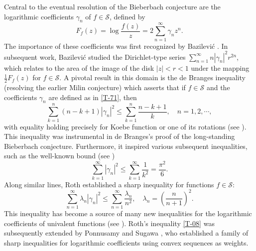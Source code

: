 \documentclass[a4paper,12pt]{amsart}
\theoremstyle{definition}
\newcounter {own}
\begin{document}
Central to the eventual resolution of the Bieberbach conjecture are the logarithmic coefficients $\gamma_n$ of $f \in \mathcal{S}$, defined by
\begin{equation}\label{T-71}
F_f(z)=\log\frac{f(z)}{z}=2\sum\limits_{n=1}^{\infty}\gamma_nz^n.
\end{equation}
The importance of these coefficients was first recognized by Bazilevi\'{c} \cite{1965-Bazilevich}. In subsequent work, Bazilevi\'{c} \cite{1967-Bazilevich} studied the Dirichlet-type series $\sum_{n=1}^{\infty} n|\gamma_n|^2 r^{2n}$, which relates to the area of the image of the disk $|z| < r<1$ under the mapping 
$\frac{1}{2}F_f(z)$ for $f\in\mathcal{S}$. A pivotal result in this domain is the de Branges inequality (resolving the earlier Milin conjecture) which asserts that if $f \in \mathcal{S}$ and the coefficients $\gamma_n$ are defined as in \eqref{T-71}, then 
$$
\sum_{k=1}^n (n-k+1)|\gamma_n|^2\le\sum_{k=1}^n \frac{n-k+1}{k}, \quad n=1,2,\cdots,
$$
with equality holding precisely for Koebe function or one of its rotations (see \cite{1985-Branges}). This inequality was instrumental in de Branges's proof of the long-standing Bieberbach conjecture. Furthermore, it inspired various subsequent inequalities, such as the well-known bound (see \cite{1979-Duren})
$$
\sum_{k=1}^\infty|\gamma_n|^2\le\sum_{k=1}^\infty \frac{1}{k^2}=\frac{\pi^2}{6}.
$$
Along similar lines, Roth \cite{Roth-2007} established a sharp inequality for functions $f \in \mathcal{S}$:
\begin{equation}\label{T-08}
\sum_{n=1}^{\infty} \lambda_n |\gamma_n|^2 \le \sum_{n=1}^{\infty} \frac{\lambda_n}{n^2}, \quad \lambda_n= \left(\frac{n}{n+1}\right)^2.
\end{equation}
This inequality has become a source of many new inequalities for the logarithmic coefficients of univalent functions (see \cite{Ponnusamy-Sharma- Wirths-2020}). Roth's inequality \eqref{T-08} was subsequently extended by Ponnusamy and Sugawa \cite{ponnusami-sugawa-2021}, who established a family of sharp inequalities for logarithmic coefficients using convex sequences as weights.\\
\end{document}
